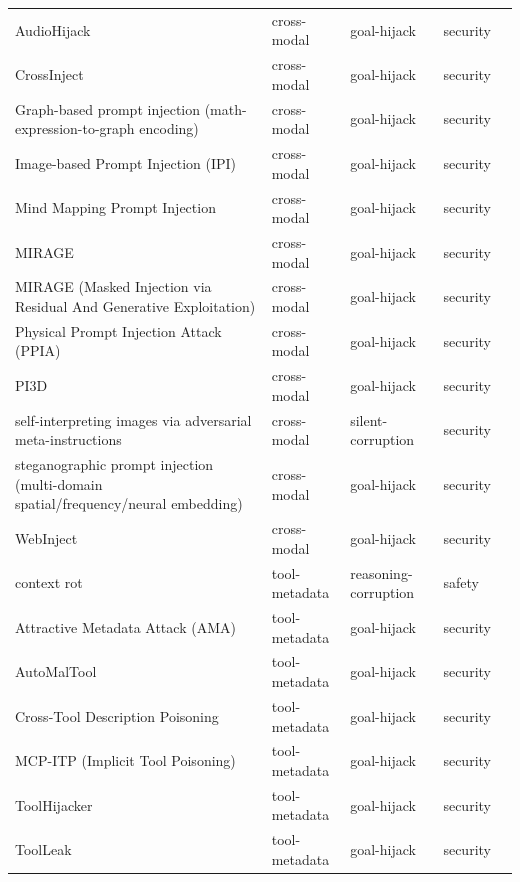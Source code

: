 \begin{longtable}{@{}p{}llll@{}}
AudioHijack & cross-modal & goal-hijack & security & \cite{chen-2026-hijacking} \\
CrossInject & cross-modal & goal-hijack & security & \cite{wang-2025-manipulating} \\
Graph-based prompt injection (math-expression-to-graph encoding) & cross-modal & goal-hijack & security & \cite{kwon-2024-graphbased} \\
Image-based Prompt Injection (IPI) & cross-modal & goal-hijack & security & \cite{nagaraja-2025-imagebased} \\
Mind Mapping Prompt Injection & cross-modal & goal-hijack & security & \cite{lee-2025-mind} \\
MIRAGE & cross-modal & goal-hijack & security & \cite{guo-2026-mirage} \\
MIRAGE (Masked Injection via Residual And Generative Exploitation) & cross-modal & goal-hijack & security & \cite{dai-2026-mirage} \\
Physical Prompt Injection Attack (PPIA) & cross-modal & goal-hijack & security & \cite{ling-2026-physical} \\
PI3D & cross-modal & goal-hijack & security & \cite{li-2026-extended} \\
self-interpreting images via adversarial meta-instructions & cross-modal & silent-corruption & security & \cite{zhang-2024-selfinterpreting} \\
steganographic prompt injection (multi-domain spatial/frequency/neural embedding) & cross-modal & goal-hijack & security & \cite{pathade-2025-invisible} \\
WebInject & cross-modal & goal-hijack & security & \cite{wang-2025-webinject} \\
context rot & tool-metadata & reasoning-corruption & safety & \cite{ayyagari-2026-context} \\
Attractive Metadata Attack (AMA) & tool-metadata & goal-hijack & security & \cite{mo-2025-attractive} \\
AutoMalTool & tool-metadata & goal-hijack & security & \cite{he-2025-automatic} \\
Cross-Tool Description Poisoning & tool-metadata & goal-hijack & security & \cite{shi-2026-think} \\
MCP-ITP (Implicit Tool Poisoning) & tool-metadata & goal-hijack & security & \cite{li-2026-mcpitp} \\
ToolHijacker & tool-metadata & goal-hijack & security & \cite{shi-2025-prompt} \\
ToolLeak & tool-metadata & goal-hijack & security & \cite{xie-2025-redteaming} \\

\end{longtable}
